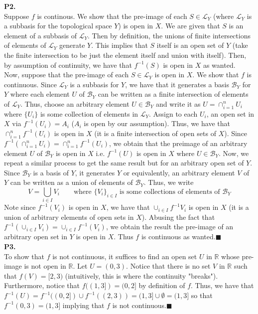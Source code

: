 \documentclass{article}
\begin{document}
    \textbf{P2.}\\
    Suppose $f$ is continous. We show that the pre-image of each $S\in\mathcal{L}_Y$ (where $\mathcal{L}_Y$ is a subbasis for
    the topological space $Y$) is open in $X$. We are given that $S$ is an element of a subbasis of $\mathcal{L}_Y$. Then by
    definition, the unions of finite intersections of elements of $\mathcal{L}_Y$ generate $Y$. This implies that $S$ itself
    is an open set of $Y$ (take the finite intersection to be just the element itself and union with itself). Then, by assumption
    of continuity, we have that $f^{-1}(S)$ is open in $X$ as wanted.\\
    Now, suppose that the pre-image of each $S\in\mathcal{L}_Y$ is open in $X$. We show that $f$ is continuous.
    Since $\mathcal{L}_Y$ is a subbasis for $Y$, we have that it generates a basis $\mathcal{B}_Y$ for $Y$ where each element $U$
    of $\mathcal{B}_Y$ can be written as a finite intersection of elements of $\mathcal{L}_Y$. Thus, choose an arbitrary element
    $U\in\mathcal{B}_Y$ and write it as $U = \cap_{i=1}^n U_i$ where $\{U_i\}$ is some collection of elements in $\mathcal{L}_Y$.
    Assign to each $U_i$, an open set in $X$ via $f^{-1}(U_i) = A_i$ ($A_i$ is open by our assumption). Thus, we have that
    $\cap_{i=1}^n f^{-1}(U_i)$ is open in $X$ (it is a finite intersection of open sets of $X$). Since
    $f^{-1}(\cap_{i=1}^n U_i) = \cap_{i=1}^n f^{-1}(U_i)$, we obtain that the preimage of an arbitrary element 
    $U$ of $\mathcal{B}_Y$ is open in $X$ i.e. $f^{-1}(U)$ is open in $X$ where $U\in\mathcal{B}_Y$. Now, we repeat a similar
    process to get the same result but for an arbitrary open set of $Y$. Since $\mathcal{B}_Y$ is a basis of $Y$, it generates
    $Y$ or equivalently, an arbitrary element $V$ of $Y$ can be written as a union of elements of $\mathcal{B}_Y$. Thus, we write
    \[ V = \bigcup_{i\in I} V_i\qquad\text{where $\{V_i\}_{i\in I}$ is some collections of elements of $\mathcal{B}_Y$} \]
    Note since $f^{-1}(V_i)$ is open in $X$, we have that 
    $\cup_{i\in I} f^{-1}{V_i}$ is open in $X$ (it is a union of arbitrary elements of open sets in $X$). Abusing the fact that
    $f^{-1}(\cup_{i\in I} V_i) = \cup_{i\in I} f^{-1}(V_i)$, we obtain the result the pre-image of an arbitrary open set in $Y$
    is open in $X$. Thus $f$ is continuous as wanted.\hfill$\blacksquare$\\

    \textbf{P3.}\\ 
    To show that $f$ is not continuous, it suffices to find an open set $U$ in $\mathbb{R}$ whose pre-image is not open
    in $\mathbb{R}$. Let $U = (0,3)$. Notice that there is no set $V$ in $\mathbb{R}$ such that $f(V) = [2,3)$ (intuitively,
    this is where the continuity "breaks"). Furthermore, notice that $f((1,3]) = (0,2]$ by definition of $f$. Thus, we have that
    $f^{-1}(U) = f^{-1}((0,2])\cup f^{-1}((2,3)) = (1,3] \cup \emptyset = (1,3]$ so that $f^{-1}{(0,3)} = (1,3]$ implying that
    $f$ is not continuous.\hfill$\blacksquare$\\
\end{document}

